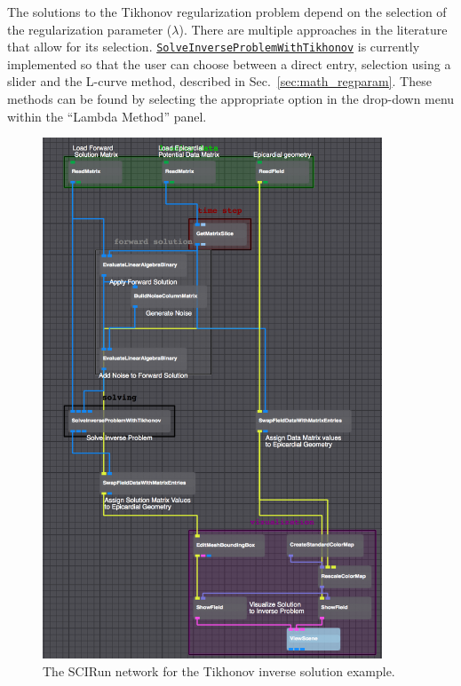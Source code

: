     
    
    The solutions to the Tikhonov regularization problem depend on the selection of the regularization parameter ($\lambda$).
    There are multiple approaches in the literature that allow for its selection.
    \href{http://scirundocwiki.sci.utah.edu/SCIRunDocs/index.php/CIBC:Documentation:SCIRun:Reference:BioPSE:SolveInverseProblemWithTikhonov}{{\tt SolveInverseProblemWithTikhonov}} is currently implemented so that the user can choose between a direct entry, selection using a slider and the L-curve method, described in Sec.~\ref{sec:math_regparam}.
    These methods can be found by selecting the appropriate option in the drop-down menu within the ``Lambda Method'' panel.
    
    
    \begin{figure}
        \begin{center}
        \includegraphics[width=0.9\textwidth]{ECGToolkitGuide_figures/TikhonovNetwork.png}
        \caption{The SCIRun network for the Tikhonov inverse solution example.}
        \label{TikhonovNetworkExample}
        \end{center}
    \end{figure}
    


